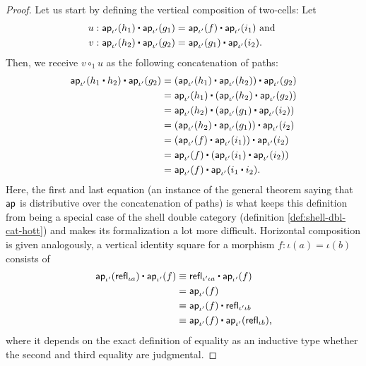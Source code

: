 \begin{proof}
Let us start by defining the vertical composition of two-cells:
Let 
\begin{align*}
u &: \apiop(h_1) \ct \apiop(g_1) = \apiop(f) \ct \apiop(i_1) \text{ and } \\
v &: \apiop(h_2) \ct \apiop(g_2) = \apiop(g_1) \ct \apiop(i_2) \text{.}
\end{align*}
Then, we receive $v \circ_1 u$ as the following concatenation of paths:
\begin{equation}
\begin{aligned}
\apiop (h_1 \ct h_2) \ct \apiop(g_2) &= (\apiop(h_1) \ct \apiop(h_2)) \ct \apiop(g_2) \\
	&= \apiop(h_1) \ct (\apiop(h_2) \ct \apiop(g_2)) \\
	&= \apiop(h_2) \ct (\apiop(g_1) \ct \apiop(i_2)) \\
	&= (\apiop(h_2) \ct \apiop(g_1)) \ct \apiop(i_2) \\
	&= (\apiop(f) \ct \apiop(i_1)) \ct \apiop(i_2) \\
	&= \apiop(f) \ct (\apiop(i_1) \ct \apiop(i_2)) \\
	&= \apiop(f) \ct \apiop(i_1 \ct i_2) \text{.}
\end{aligned}
\end{equation}
Here, the first and last equation (an instance of the general theorem saying that $\mathsf{ap}$
is distributive over the concatenation of paths) is what keeps this definition from
being a special case of the shell double category (definition \ref{def:shell-dbl-cat-hott})
and makes its formalization a lot more difficult. Horizontal composition is given
analogously, a vertical identity square for a morphism $f : \iota(a) = \iota(b)$
consists of
\begin{align*}
\apiop(\refl_{\iota a}) \ct \apiop(f) &\equiv \refl_{\iota' \iota a} \ct \apiop(f) \\
	&= \apiop(f) \\
	&\equiv \apiop(f) \ct \refl_{\iota' \iota b} \\
	&\equiv \apiop(f) \ct \apiop(\refl_{\iota b}) \text{,}
\end{align*}
where it depends on the exact definition of equality as an inductive type whether
the second and third equality are judgmental.


\end{proof}
